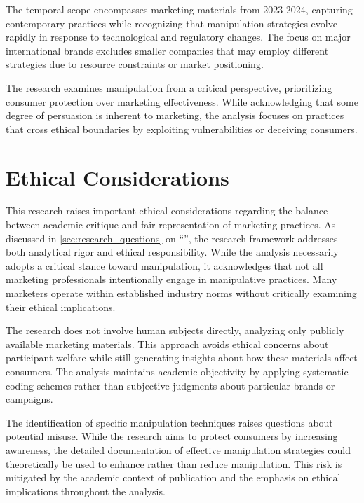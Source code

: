 The temporal scope encompasses marketing materials from 2023-2024, capturing contemporary practices while recognizing that manipulation strategies evolve rapidly in response to technological and regulatory changes. The focus on major international brands excludes smaller companies that may employ different strategies due to resource constraints or market positioning.

The research examines manipulation from a critical perspective, prioritizing consumer protection over marketing effectiveness. While acknowledging that some degree of persuasion is inherent to marketing, the analysis focuses on practices that cross ethical boundaries by exploiting vulnerabilities or deceiving consumers.

\section{Ethical Considerations}
\label{sec:ethical_considerations}

This research raises important ethical considerations regarding the balance between academic critique and fair representation of marketing practices. As discussed in \autoref{sec:research_questions} on ``'', the research framework addresses both analytical rigor and ethical responsibility. While the analysis necessarily adopts a critical stance toward manipulation, it acknowledges that not all marketing professionals intentionally engage in manipulative practices. Many marketers operate within established industry norms without critically examining their ethical implications.

The research does not involve human subjects directly, analyzing only publicly available marketing materials. This approach avoids ethical concerns about participant welfare while still generating insights about how these materials affect consumers. The analysis maintains academic objectivity by applying systematic coding schemes rather than subjective judgments about particular brands or campaigns.

The identification of specific manipulation techniques raises questions about potential misuse. While the research aims to protect consumers by increasing awareness, the detailed documentation of effective manipulation strategies could theoretically be used to enhance rather than reduce manipulation. This risk is mitigated by the academic context of publication and the emphasis on ethical implications throughout the analysis.

